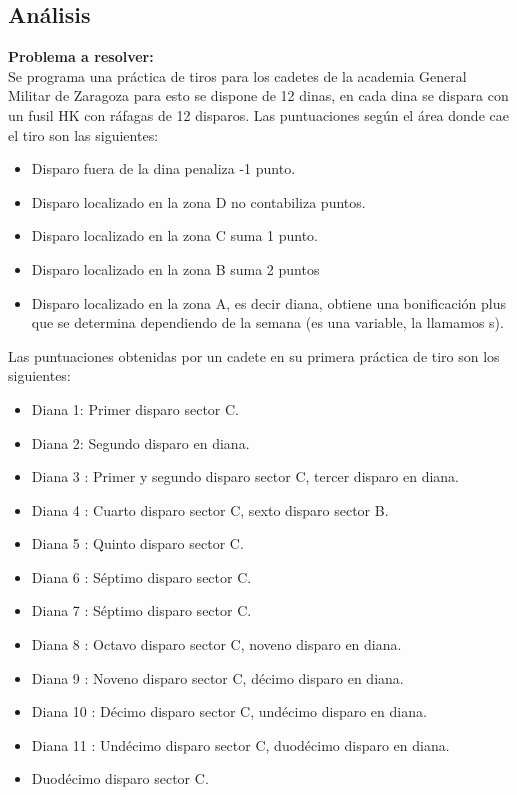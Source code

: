 \documentclass[12pt,a4paper]{article}
\begin{document}
\begin{multicols}{2}
	\section{Análisis}
	
	\noindent\textbf{ Problema a resolver:}\\
	\noindent Se programa una práctica de tiros para los cadetes de la academia General Militar de Zaragoza para esto se dispone de 12 dinas, en cada dina se dispara con un fusil HK con ráfagas de 12 disparos. Las puntuaciones según el área donde cae el tiro son las siguientes:
	\begin{itemize}
		\item Disparo fuera de la dina penaliza -1 punto.
		\item Disparo localizado en la zona D no contabiliza puntos.
		\item Disparo localizado en la zona C suma 1 punto.
		\item Disparo localizado en la zona B suma 2 puntos
		\item Disparo localizado en la zona A, es decir diana, obtiene una bonificación plus que se determina dependiendo de la semana (es una variable, la llamamos s).
	\end{itemize}
	Las puntuaciones obtenidas por un cadete en su primera práctica de tiro son los siguientes:
	\begin{itemize}
		\item Diana 1: Primer disparo sector C.
		\item Diana 2: Segundo disparo en diana.
		\item Diana 3 : Primer y segundo disparo sector C, tercer disparo en diana.
		\item Diana 4 : Cuarto disparo sector C, sexto disparo sector B.
		\item Diana 5 : Quinto disparo sector C.
		\item Diana 6 : Séptimo disparo sector C.
		\item Diana 7 : Séptimo disparo sector C.
		\item Diana 8 : Octavo disparo sector C, noveno disparo en diana.
		\item Diana 9 : Noveno disparo sector C, décimo disparo en diana.
		\item Diana 10 : Décimo disparo sector C, undécimo disparo en diana.
		\item Diana 11 : Undécimo disparo sector C, duodécimo disparo en diana.
		\item Duodécimo disparo sector C.
		

\end{itemize}
\end{multicols}
\end{document}
